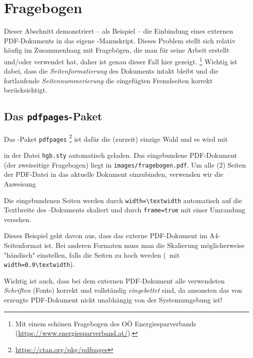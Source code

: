 \chapter{Fragebogen}
\label{app:Fragebogen}


Dieser Abschnitt demonstriert -- als Beispiel -- die Einbindung eines
externen PDF-Dokuments in das eigene \latex-Manuskript. Dieses Problem stellt
sich relativ häufig im Zusammenhang mit Fragebögen, die man für seine Arbeit
erstellt und/oder verwendet hat, daher ist genau dieser Fall hier gezeigt.%
\footnote{Mit einem schönen Fragebogen des OÖ Energiesparverbands
(\url{https://www.energiesparverband.at/}).} Wichtig ist dabei, dass die
\emph{Seitenformatierung} des Dokuments intakt bleibt und die fortlaufende
\emph{Seitennummerierung} die eingefügten Fremdseiten korrekt berücksichtigt.


\section{Das \texttt{pdfpages}-Paket}

Das \latex-Paket \texttt{pdfpages}%
\footnote{\url{https://ctan.org/pkg/pdfpages}}
ist dafür die (zurzeit) einzige Wahl und es wird mit 
%
\begin{LaTeXCode}[numbers=none]
\RequirePackage{pdfpages}
\end{LaTeXCode}
%
in der Datei \nolinkurl{hgb.sty} automatisch geladen. Das eingebundene
PDF-Dokument (der zweiseitige Frage\-bogen) liegt in
\nolinkurl{images/fragebogen.pdf}. Um alle (2) Seiten der
PDF-Datei in das aktuelle Dokument einzubinden, verwenden wir die Anweisung
%
\begin{LaTeXCode}[numbers=none]

\end{LaTeXCode}
%
Die eingebundenen Seiten werden durch \verb!width=\textwidth! automatisch auf
die Textbreite des \latex-Dokuments skaliert und durch \verb!frame=true! mit
einer Umrandung versehen.

Dieses Beispiel geht davon aus, dass das externe PDF-Dokument im
A4-Seitenformat ist. Bei anderen Formaten muss man die Skalierung
möglicherweise "händisch" einstellen, falls die Seiten zu hoch werden (\zB\
mit \verb!width=0.9\textwidth!).

Wichtig ist auch, dass bei dem externen PDF-Dokument alle verwendeten
\emph{Schriften} (Fonts) korrekt und vollständig \emph{eingebettet} sind, da
ansonsten das von \latex erzeugte PDF-Dokument nicht unabhängig von der
Systemumgebung ist!


